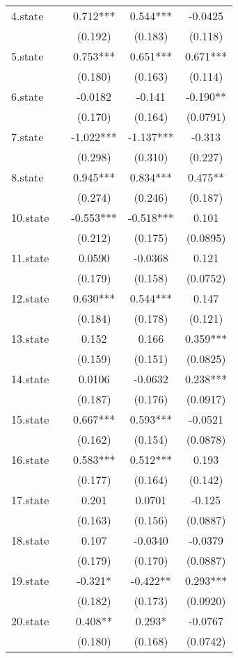 \documentclass[]{article}
\begin{document}
\begin{tabular}{lcccc}
4.state &  & 0.712*** & 0.544*** & -0.0425 \\
 &  & (0.192) & (0.183) & (0.118) \\
5.state &  & 0.753*** & 0.651*** & 0.671*** \\
 &  & (0.180) & (0.163) & (0.114) \\
6.state &  & -0.0182 & -0.141 & -0.190** \\
 &  & (0.170) & (0.164) & (0.0791) \\
7.state &  & -1.022*** & -1.137*** & -0.313 \\
 &  & (0.298) & (0.310) & (0.227) \\
8.state &  & 0.945*** & 0.834*** & 0.475** \\
 &  & (0.274) & (0.246) & (0.187) \\
10.state &  & -0.553*** & -0.518*** & 0.101 \\
 &  & (0.212) & (0.175) & (0.0895) \\
11.state &  & 0.0590 & -0.0368 & 0.121 \\
 &  & (0.179) & (0.158) & (0.0752) \\
12.state &  & 0.630*** & 0.544*** & 0.147 \\
 &  & (0.184) & (0.178) & (0.121) \\
13.state &  & 0.152 & 0.166 & 0.359*** \\
 &  & (0.159) & (0.151) & (0.0825) \\
14.state &  & 0.0106 & -0.0632 & 0.238*** \\
 &  & (0.187) & (0.176) & (0.0917) \\
15.state &  & 0.667*** & 0.593*** & -0.0521 \\
 &  & (0.162) & (0.154) & (0.0878) \\
16.state &  & 0.583*** & 0.512*** & 0.193 \\
 &  & (0.177) & (0.164) & (0.142) \\
17.state &  & 0.201 & 0.0701 & -0.125 \\
 &  & (0.163) & (0.156) & (0.0887) \\
18.state &  & 0.107 & -0.0340 & -0.0379 \\
 &  & (0.179) & (0.170) & (0.0887) \\
19.state &  & -0.321* & -0.422** & 0.293*** \\
 &  & (0.182) & (0.173) & (0.0920) \\
20.state &  & 0.408** & 0.293* & -0.0767 \\
 &  & (0.180) & (0.168) & (0.0742) \\

\end{tabular}
\end{document}
